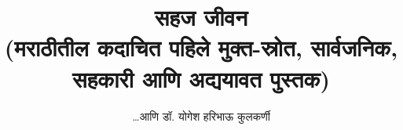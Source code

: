
\usepackage{fontspec}
\usepackage{tikz}
\usepackage{everypage}

\setmainfont[Script=Devanagari] {Tiro Devanagari Marathi}
\newfontfamily{}
\newfontfamily{}
\graphicspath{{images/}}


\date{} %


\title{
    {\Huge \textbf{सहज जीवन}} \\ 
    \vspace{0.5em}
    {\large (मराठीतील कदाचित पहिले मुक्त-स्रोत, सार्वजनिक, सहकारी आणि अद्ययावत पुस्तक)}
}
\author{\Large\textsc{\ldots आणि डॉ. योगेश हरिभाऊ कुलकर्णी}}


\frontmatter
\maketitle


\tableofcontents

\mainmatter




